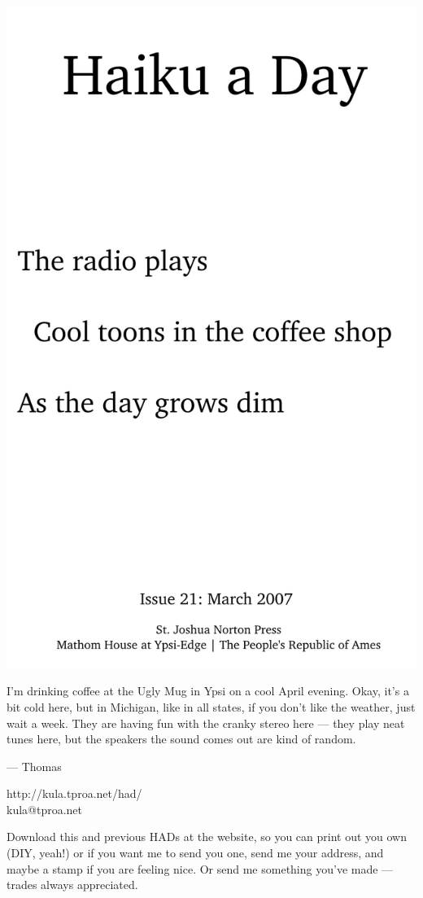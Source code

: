 \documentclass[12pt]{article}
\begin{document}
\includegraphics{frontpage.png}

\newpage

I'm drinking coffee at the Ugly Mug in Ypsi on a
cool April evening. Okay, it's a bit cold here, but
in Michigan, like in all states, if you don't like
the weather, just wait a week. They are having
fun with the cranky stereo here --- they play neat
tunes here, but the speakers the sound comes out are
kind of random. 

--- Thomas

http://kula.tproa.net/had/ \\
kula@tproa.net

Download this and previous HADs at the website, so you can
print out you own (DIY, yeah!) or if you want me to send
you one, send me your address, and maybe a stamp if you
are feeling nice. Or send me something you've made ---
trades always appreciated.
\end{document}
